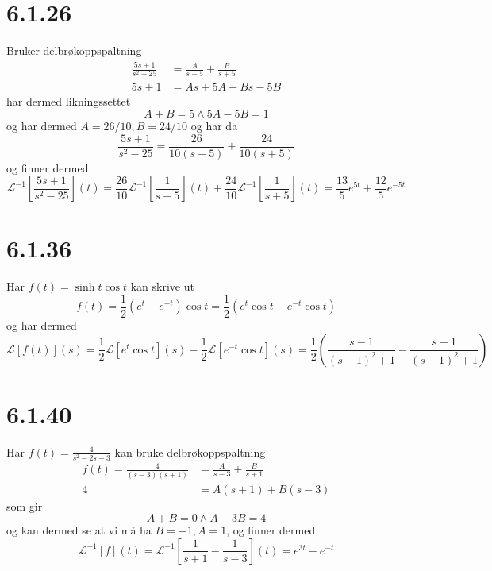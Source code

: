 \documentclass{report}
\newcommand{\nbrack}[1]{\left( #1 \right)}
\newcommand{\bbrack}[1]{\left[ #1 \right]}
\newcommand{\Lplc}[1]{\mathscr{L}\bbrack{ #1 } (s)}
\newcommand{\iLplc}[1]{\mathscr{L}^{-1}\bbrack{ #1 } (t)}
\begin{document}
\section*{6.1.26}
Bruker delbrøkoppspaltning
\begin{equation}
\begin{split}
  \label{eq:7}
  \frac{5s + 1}{s^{2} - 25} &= \frac{A}{s-5} + \frac{B}{s+5} \\
  5s + 1 &= As + 5A + Bs - 5B
\end{split}
\end{equation}
har dermed likningssettet
\begin{equation}
  \label{eq:8}
  A + B = 5 \land 5A - 5B = 1
\end{equation}
og har dermed $A = 26/10, B = 24/10$ og har da
\begin{equation}
  \label{eq:9}
  \frac{5s + 1}{s^{2} - 25} = \frac{26}{10\nbrack{s - 5}} + \frac{24}{10\nbrack{s+5}}
\end{equation}
og finner dermed
\begin{equation}
  \iLplc{\frac{5s + 1}{s^{2} - 25}} = \frac{26}{10} \iLplc{\frac{1}{s-5}} + \frac{24}{10} \iLplc{\frac{1}{s+5}} = \frac{13}{5} e^{5t} + \frac{12}{5} e^{-5t}
\end{equation}


\section*{6.1.36}
Har $f(t) = \sinh t \cos t$ kan skrive ut
\begin{equation}
  \label{eq:10}
  f(t) = \frac{1}{2} \nbrack{e^{t} - e^{-t}} \cos t = \frac{1}{2} \nbrack{ e^{t} \cos t - e^{-t} \cos t }
\end{equation}
og har dermed
\begin{equation}
  \label{eq:11}
  \Lplc{f(t)} = \frac{1}{2} \Lplc{e^{t} \cos t} - \frac{1}{2} \Lplc{e^{-t} \cos t} = \frac{1}{2} \nbrack{ \frac{s-1}{\nbrack{s-1}^{2} + 1} - \frac{s+1}{\nbrack{s+1}^{2} + 1}}
\end{equation}



\section*{6.1.40}
Har $f(t) = \frac{4}{s^{2} - 2s - 3}$ kan bruke delbrøkoppspaltning
\begin{equation}
  \label{eq:12}
  \begin{split}
    f(t) = \frac{4}{(s-3)(s+1)} &= \frac{A}{s-3} + \frac{B}{s+1} \\
    4 &= A(s+1) + B(s-3)
  \end{split}
\end{equation}
som gir
\begin{equation}
  \label{eq:13}
  A + B = 0 \land A - 3B = 4
\end{equation}
og kan dermed se at vi må ha $B = -1, A = 1$, og finner dermed
\begin{equation}
  \label{eq:14}
  \iLplc{f} = \iLplc{\frac{1}{s+1} - \frac{1}{s-3}} = e^{3t} - e^{-t}
\end{equation}
\end{document}
